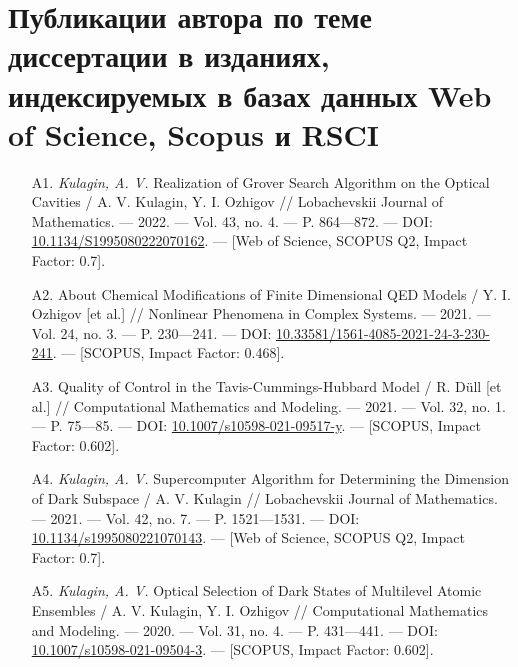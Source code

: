 \clearpage

\chapter*{
	Публикации автора по теме диссертации в изданиях, индексируемых в базах данных Web of Science, Scopus и RSCI
}
\vspace{-1em}
\hypersetup{urlcolor=blue}
{\seminormalsize
\begin{itemize}[leftmargin=24pt]
	\item[A1.]{\textit{Kulagin, A. V.} Realization of Grover Search Algorithm on the Opti­cal Cavities / A. V. Kulagin, Y. I. Ozhigov // Lobachevskii Journal of Mathematics. — 2022. — Vol. 43, no. 4. — P. 864—872. — DOI: \href{https://doi.org/10.1134/S1995080222070162}{10.1134/S1995080222070162}. — [Web of Science, SCOPUS Q2, Impact Factor: 0.7].}
	\item[A2.]{About Chemical Modifications of Finite Dimensional QED Models / Y. I. Ozhigov [et al.] // Nonlinear Phenomena in Complex Systems. — 2021. — Vol. 24, no. 3. — P. 230—241. — DOI: \href{https://doi.org/10.33581/1561-4085-2021-24-3-230-241}{10.33581/1561-4085-2021-24-3-230-241}. — [SCOPUS, Impact Factor: 0.468].}
	\item[A3.]{Quality of Control in the Tavis-Cummings-Hubbard Model / R. Düll [et al.] // Computational Mathematics and Modeling. — 2021. — Vol. 32, no. 1. — P. 75—85. — DOI: \href{https://doi.org/10.1007/s10598-021-09517-y}{10.1007/s10598-021-09517-y}. — [SCOPUS, Impact Factor: 0.602].}
	\item[A4.]{\textit{Kulagin, A. V.} Supercomputer Algorithm for Determining the Dimension of Dark Subspace / A. V. Kulagin // Lobachevskii Journal of Mathemat­ics. — 2021. — Vol. 42, no. 7. — P. 1521—1531. — DOI: \href{https://doi.org/10.1134/s1995080221070143}{10.1134/s1995080221070143}. — [Web of Science, SCOPUS Q2, Impact Factor: 0.7].}
	\item[A5.]{\textit{Kulagin, A. V.} Optical Selection of Dark States of Multilevel Atomic Ensembles / A. V. Kulagin, Y. I. Ozhigov // Computational Mathematics and Modeling. — 2020. — Vol. 31, no. 4. — P. 431—441. — DOI: \href{https://doi.org/10.1007/s10598-021-09504-3}{10.1007/s10598-021-09504-3}. — [SCOPUS, Impact Factor: 0.602].}
\end{itemize}
}
